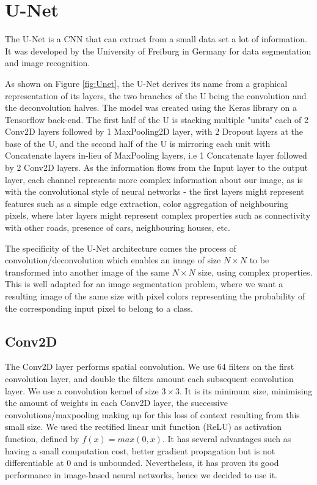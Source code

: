 \documentclass[10pt,conference,compsocconf]{IEEEtran}
\begin{document}
\section{U-Net}
The U-Net \cite{DBLP:journals/corr/RonnebergerFB15} is a CNN that can extract from a small data set a lot of information. It was developed by the University of Freiburg in Germany for data segmentation and image recognition. 

As shown on Figure \ref{fig:Unet}, the U-Net derives its name from a graphical representation of its layers, the two branches of the U being the convolution and the deconvolution halves. The model was created using the Keras library on a Tensorflow back-end. The first half of the U is stacking multiple "units" each of 2 Conv2D layers followed by 1 MaxPooling2D layer, with 2 Dropout layers at the base of the U, and the second half of the U is mirroring each unit with Concatenate layers in-lieu of MaxPooling layers, i.e 1 Concatenate layer followed by 2 Conv2D layers. As the information flows from the Input layer to the output layer, each channel represents more complex information about our image, as is with the convolutional style of neural networks - the first layers might represent features such as a simple edge extraction, color aggregation of neighbouring pixels, where later layers might represent complex properties such as connectivity with other roads, presence of cars, neighbouring houses, etc.

The specificity of the U-Net architecture comes the process of convolution/deconvolution which enables an image of size $N \times N$ to be transformed into another image of the same $N \times N$ size, using complex properties. This is well adapted for an image segmentation problem, where we want a resulting image of the same size with pixel colors representing the probability of the corresponding input pixel to belong to a class.

\subsection{Conv2D}
The Conv2D layer performs spatial convolution. We use 64 filters on the first convolution layer, and double the filters amount each subsequent convolution layer. We use a convolution kernel of size $3\times3$. It is its minimum size, minimising the amount of weights in each Conv2D layer, the successive convolutions/maxpooling making up for this loss of context resulting from this small size. We used the rectified linear unit function (ReLU) as activation function, defined by $f(x)=max(0,x)$. It has several advantages such as having a small computation cost, better gradient propagation but is not differentiable at 0 and is unbounded. Nevertheless, it has proven its good performance in image-based neural networks, hence we decided to use it.
\end{document}
